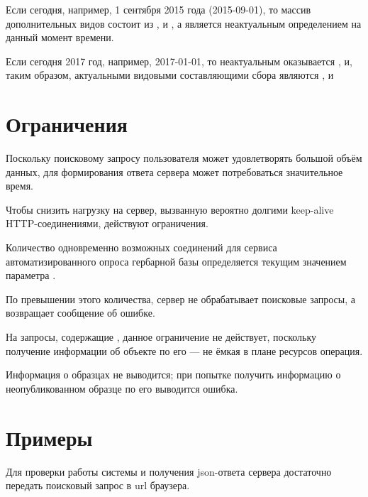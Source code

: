 \documentclass[letterpaper,10pt,russian]{sphinxmanual}
\begin{document}
Если сегодня, например, 1 сентября 2015 года (2015-09-01), то массив дополнительных видов состоит из
,  и , а  является неактуальным определением
на данный момент времени.

Если сегодня 2017 год, например, 2017-01-01, то неактуальным оказывается ,  и, таким образом,
актуальными видовыми составляющими сбора являются ,  и 

\ignorespaces 

\section{Ограничения}
\label{\detokenize{http_api:id12}}\label{\detokenize{http_api:index-6}}
Поскольку поисковому запросу пользователя может удовлетворять большой объём данных,
для формирования ответа сервера может потребоваться значительное время.

Чтобы снизить нагрузку на сервер, вызванную вероятно долгими
keep-alive HTTP-соединениями, действуют ограничения.

Количество одновременно возможных
соединений для сервиса автоматизированного опроса гербарной базы определяется текущим значением параметра .

По превышении этого количества, сервер не обрабатывает поисковые запросы, а возвращает
сообщение об ошибке.

На запросы, содержащие  , данное ограничение не действует, поскольку получение информации об объекте
по его   — не ёмкая в плане ресурсов операция.

Информация о   образцах не выводится; при попытке получить информацию о неопубликованном образце по его 
выводится ошибка.

\ignorespaces 

\section{Примеры}
\label{\detokenize{http_api:index-7}}\label{\detokenize{http_api:id13}}
Для проверки работы системы и получения json-ответа сервера достаточно передать поисковый запрос в url браузера.
\end{document}
